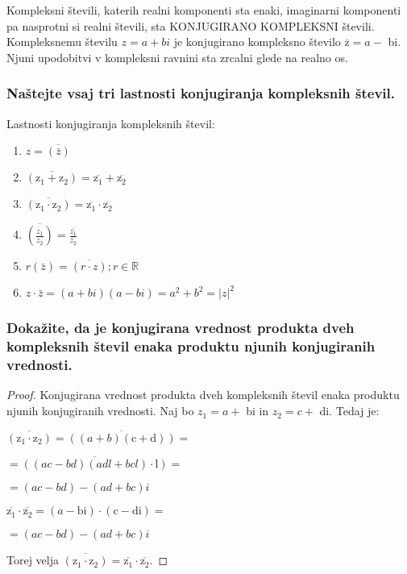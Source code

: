\documentclass{article}
\begin{document}
Kompleksni števili, katerih realni komponenti sta enaki, imaginarni komponenti pa nasprotni si realni števili, sta KONJUGIRANO KOMPLEKSNI števili. Kompleksnemu številu $z=a+b i$ je konjugirano kompleksno število $\overline{\mathrm{z}}=a-$ bi. Njuni upodobitvi v kompleksni ravnini sta zrcalni glede na realno os.

\subsubsection*{Naštejte vsaj tri lastnosti konjugiranja kompleksnih števil.}

Lastnosti konjugiranja kompleksnih števil:
\begin{enumerate}
  \item $z=\overline{(\bar{z})}$

  \item $\overline{\left(\mathrm{z}_{1}+\mathrm{z}_{2}\right)}=\overline{\mathrm{z}_{1}}+\overline{\mathrm{z}_{2}}$

  \item $\overline{\left(\mathrm{z}_{1} \cdot \mathrm{z}_{2}\right)}=\overline{\mathrm{z}_{1}} \cdot \overline{\mathrm{z}_{2}}$

  \item $\overline{\left(\frac{z_{1}}{z_{2}}\right)}=\frac{\overline{z_{1}}}{\overline{z_{2}}}$

  \item $r(\bar{z})=\overline{(r \cdot z)} ; r \in \mathbb{R}$

  \item $z \cdot \bar{z}=(a+b i)(a-b i)=a^{2}+b^{2}=|z|^{2}$

\end{enumerate}
   
\subsubsection*{Dokažite, da je konjugirana vrednost produkta dveh kompleksnih števil enaka produktu njunih konjugiranih vrednosti.}

\begin{proof}
    Konjugirana vrednost produkta dveh kompleksnih števil enaka produktu njunih konjugiranih vrednosti.
    Naj bo $z_{1}=a+$ bi in $z_{2}=c+$ di. Tedaj je:

$\overline{\left(\mathrm{z}_{1} \cdot \mathrm{z}_{2}\right)}=\overline{((a+b)(\mathrm{c}+\mathrm{d}))}=$

$=\overline{((a c-b d)(a d l+b c l) \cdot \mathrm{l})}=$

$=(a c-b d)-(a d+b c) i$

$\overline{\mathrm{z}_{1}} \cdot \overline{\mathrm{z}_{2}}=(a-\mathrm{bi}) \cdot(\mathrm{c}-\mathrm{di})=$

$=(a c-b d)-(a d+b c) i$

Torej velja $\overline{\left(\mathrm{z}_{1} \cdot \mathrm{z}_{2}\right)}=\overline{\mathrm{z}_{1}} \cdot \overline{\mathrm{z}_{2}}$. 
\end{proof}
\end{document}
